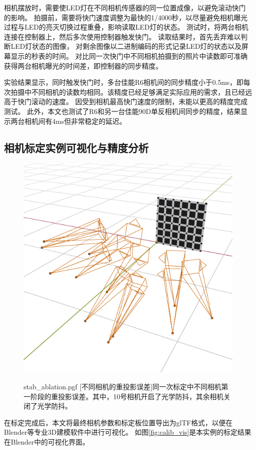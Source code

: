 相机摆放时，需要使LED灯在不同相机传感器的同一位置成像，以避免滚动快门的影响。
拍摄前，需要将快门速度调整为最快的1/4000秒，以尽量避免相机曝光过程与LED的亮灭切换过程重叠，影响读取LED灯的状态。
测试时，将两台相机连接在控制器上，然后多次使用控制器触发快门。
读取结果时，首先丢弃难以判断LED灯状态的图像，
对剩余图像以二进制编码的形式记录LED灯的状态以及屏幕显示的秒表的时间。
对比同一次快门中不同相机拍摄到的照片中读数即可准确获得两台相机曝光的时间差，即控制器的同步精度。

实验结果显示，同时触发快门时，多台佳能R6相机间的同步精度小于0.5ms，即每次拍摄中不同相机的读数均相同。该精度已经足够满足实际应用的需求，且已经远高于快门滚动的速度。
因受到相机最高快门速度的限制，未能以更高的精度完成测试。
此外，本文也测试了R6和另一台佳能90D单反相机间同步的精度，结果显示两台相机间有4ms但非常稳定的延迟。

\subsection{相机标定实例可视化与精度分析}

\begin{figure}
    \begin{minipage}{0.38\textwidth}
        \centering
        \includegraphics[width=\textwidth]{figures/calib_vis}
        \label{fig:calib_vis}
    \end{minipage}\hfill%
    \begin{minipage}{0.56\textwidth}
        \centering
        {stab_ablation.pgf}
        [不同相机的重投影误差]{同一次标定中不同相机第一阶段的重投影误差。其中，10号相机开启了光学防抖，其余相机关闭了光学防抖。}
        \label{fig:stablize_ablation}
    \end{minipage}%
\end{figure}
在标定完成后，本文将最终相机参数和标定板位置导出为glTF格式，以便在Blender等专业3D建模软件中进行可视化。
如图\ref{fig:calib_vis}是本实例的标定结果在Blender中的可视化界面。

